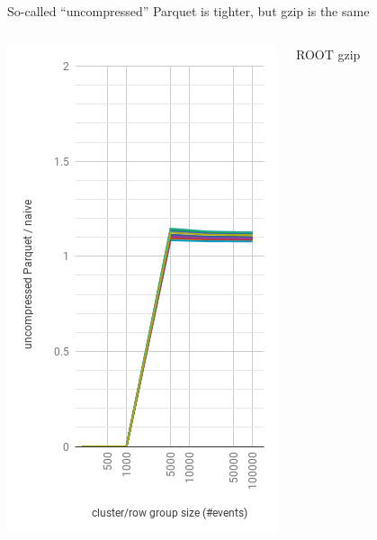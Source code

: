 \documentclass[aspectratio=169]{beamer}
\begin{document}
\begin{frame}{So-called ``uncompressed'' Parquet is tighter, but gzip is the same}
\begin{columns}
\begin{center}
\includegraphics[width=\linewidth]{parquet-none.png}
\end{center}
\begin{center}
ROOT gzip


\end{center}
\end{columns}
\end{frame}
\end{document}
